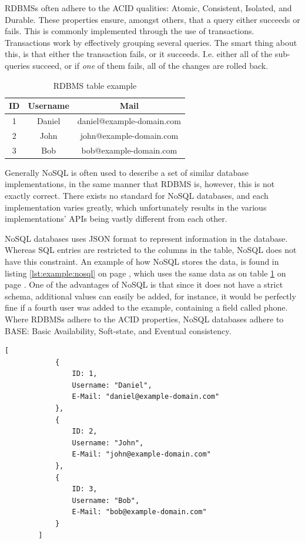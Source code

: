 		RDBMSs often adhere to the ACID qualities: Atomic, Consistent, Isolated, and Durable. These properties ensure, amongst others, that a query either succeeds or fails. This is commonly implemented through the use of transactions. Transactions work by effectively grouping several queries. The smart thing about this, is that either the transaction fails, or it succeeds. I.e. either all of the sub-queries succeed, or if \emph{one} of them fails, all of the changes are rolled back.

		\begin{table}[h!]
			\centering
			\begin{tabular}{|c|c|c|}
				\hline
				\textbf{ID} 		& 	\textbf{Username} 		& \textbf{Mail} 		\\
				\hline
				1 					& Daniel 					& daniel@example-domain.com 		\\
				\hline
				2 					& John 						& john@example-domain.com 	\\
				\hline
				3 					& Bob 						& bob@example-domain.com 	\\
				\hline
			\end{tabular}
			\caption{RDBMS table example}
			\label{fig:example:rldb}
		\end{table}

		Generally NoSQL is often used to describe a set of similar database implementations, in the same manner that RDBMS is, however, this is not exactly correct. There exists no standard for NoSQL databases, and each implementation varies greatly, which unfortunately results in the various implementations' APIs being vastly different from each other.

		NoSQL databases uses JSON format to represent information in the database. Whereas SQL entries are restricted to the columns in the table, NoSQL does not have this constraint. An example of how NoSQL stores the data, is found in listing \ref{lst:example:nosql} on page \pageref{lst:example:nosql}, which uses the same data as on table \ref{fig:example:rldb} on page \pageref{fig:example:rldb}. One of the advantages of NoSQL is that since it does not have a strict schema, additional values can easily be added, for instance, it would be perfectly fine if a fourth user was added to the example, containing a field called phone. Where RDBMSs adhere to the ACID properties, NoSQL databases adhere to BASE: Basic Availability, Soft-state, and Eventual consistency.

		\begin{lstlisting}[style=json2,gobble=8, caption={NoSQL table example},label={lst:example:nosql}]
        [
            {
                ID: 1,
                Username: "Daniel",
                E-Mail: "daniel@example-domain.com"
            },
            {
                ID: 2,
                Username: "John",
                E-Mail: "john@example-domain.com"
            },
            {
                ID: 3,
                Username: "Bob",
                E-Mail: "bob@example-domain.com"
            }
        ]
		\end{lstlisting}

